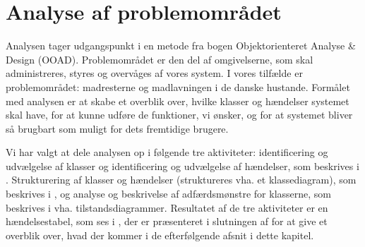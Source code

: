 \chapter{Analyse af problemområdet}
\label{chap:analyseafpo}

Analysen tager udgangspunkt i en metode fra bogen Objektorienteret Analyse \& Design (OOAD)\cite[s. ~43]{ooad}. Problemområdet er den del af omgivelserne, som skal administreres, styres og overvåges af vores system. I vores tilfælde er problemområdet: madresterne og madlavningen i de danske hustande. Formålet med analysen er at skabe et overblik over, hvilke klasser og hændelser systemet skal have, for at kunne udføre de funktioner, vi ønsker, og for at systemet bliver så brugbart som muligt for dets fremtidige brugere. 

Vi har valgt at dele analysen op i følgende tre aktiviteter: identificering og udvælgelse af klasser og identificering og udvælgelse af hændelser, som beskrives i . Strukturering af klasser og hændelser (struktureres vha. et klassediagram), som beskrives i , og analyse og beskrivelse af adfærdsmønstre for klasserne, som beskrives i  vha. tilstandsdiagrammer. Resultatet af de tre aktiviteter er en hændelsestabel, som ses i , der er præsenteret i slutningen af  for at give et overblik over, hvad der kommer i de efterfølgende afsnit i dette kapitel.

 
            
 
       


